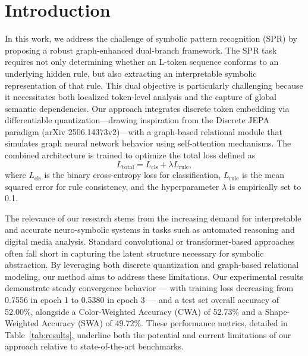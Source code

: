 \documentclass{article}
\begin{document}
\section{Introduction}
In this work, we address the challenge of symbolic pattern recognition (SPR) by proposing a robust graph-enhanced dual-branch framework. The SPR task requires not only determining whether an L-token sequence conforms to an underlying hidden rule, but also extracting an interpretable symbolic representation of that rule. This dual objective is particularly challenging because it necessitates both localized token-level analysis and the capture of global semantic dependencies. Our approach integrates discrete token embedding via differentiable quantization—drawing inspiration from the Discrete JEPA paradigm (arXiv 2506.14373v2)—with a graph-based relational module that simulates graph neural network behavior using self-attention mechanisms. The combined architecture is trained to optimize the total loss defined as
\[
L_{\text{total}} = L_{\text{cls}} + \lambda L_{\text{rule}},
\]
where \( L_{\text{cls}} \) is the binary cross-entropy loss for classification, \( L_{\text{rule}} \) is the mean squared error for rule consistency, and the hyperparameter \(\lambda\) is empirically set to 0.1.

The relevance of our research stems from the increasing demand for interpretable and accurate neuro-symbolic systems in tasks such as automated reasoning and digital media analysis. Standard convolutional or transformer-based approaches often fall short in capturing the latent structure necessary for symbolic abstraction. By leveraging both discrete quantization and graph-based relational modeling, our method aims to address these limitations. Our experimental results demonstrate steady convergence behavior — with training loss decreasing from 0.7556 in epoch 1 to 0.5380 in epoch 3 — and a test set overall accuracy of 52.00\%, alongside a Color-Weighted Accuracy (CWA) of 52.73\% and a Shape-Weighted Accuracy (SWA) of 49.72\%. These performance metrics, detailed in Table~\ref{tab:results}, underline both the potential and current limitations of our approach relative to state-of-the-art benchmarks.
\end{document}
